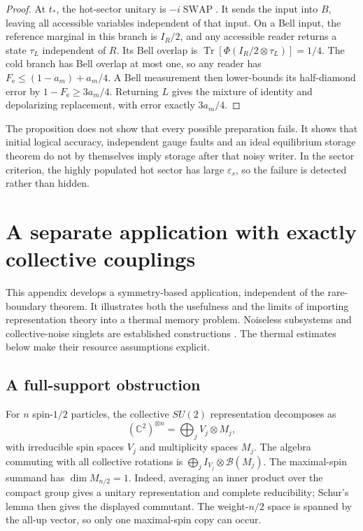 \documentclass[11pt,reqno]{amsart}
\numberwithin{equation}{section}
\theoremstyle{definition}
\theoremstyle{remark}
\newcommand{\Tr}{\operatorname{Tr}}
\newcommand{\Bcal}{\mathcal B}
\newcommand{\Fe}{F_{\mathrm e}}
\begin{document}
\begin{proof}
At \(t_*\), the hot-sector unitary is \(-i\operatorname{SWAP}\).
It sends the input into \(B\), leaving all accessible variables
independent of that input. On a Bell input, the reference marginal in
this branch is \(I_R/2\), and any accessible reader returns a state
\(\tau_L\) independent of \(R\). Its Bell overlap is
\(\Tr[\Phi(I_R/2\otimes\tau_L)]=1/4\).
The cold branch has Bell overlap at most one, so any reader has
\(\Fe\le(1-a_m)+a_m/4\).
A Bell measurement then lower-bounds its half-diamond error by
\(1-\Fe\ge3a_m/4\). Returning \(L\) gives the mixture of identity
and depolarizing replacement, with error exactly \(3a_m/4\).
\end{proof}

The proposition does not show that every possible preparation fails.
It shows that initial logical accuracy, independent gauge faults and
an ideal equilibrium storage theorem do not by themselves imply
storage after that noisy writer. In the sector criterion,
the highly populated hot sector has large \(\varepsilon_s\), so the
failure is detected rather than hidden.

\section{A separate application with exactly collective couplings}
\label{app:collective}

This appendix develops a symmetry-based application, independent of the
rare-boundary theorem. It illustrates both the usefulness and the limits
of importing representation theory into a thermal memory problem.
Noiseless subsystems and collective-noise singlets are established
constructions \cite{KLV00,KBLW01}. The thermal estimates below
make their resource assumptions explicit.

\subsection{A full-support obstruction}

For \(n\) spin-\(1/2\) particles, the collective \(SU(2)\) representation
decomposes as
\[
            (\mathbb C^2)^{\otimes n}
                     =\bigoplus_j V_j\otimes M_j,
\]
with irreducible spin spaces \(V_j\) and multiplicity spaces \(M_j\).
The algebra commuting with all collective rotations is
\(\bigoplus_j I_{V_j}\otimes\Bcal(M_j)\).
The maximal-spin summand has \(\dim M_{n/2}=1\).
Indeed, averaging an inner product over the compact group gives a unitary
representation and complete reducibility; Schur's lemma then gives
the displayed commutant. The weight-\(n/2\) space is spanned by the
all-up vector, so only one maximal-spin copy can occur.
\end{document}
